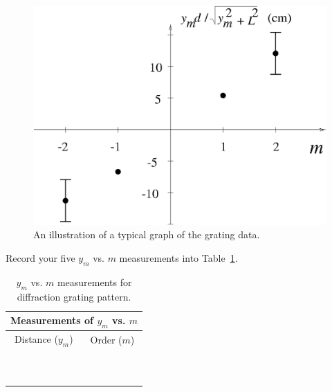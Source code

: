 \begin{figure}[htb]
\centering 
\epsfxsize=7cm \includegraphics[scale=0.6]{10_diffraction/gratgraph.eps}
\caption{An illustration of a typical graph of the grating data.}
\label{fig:diff:gratgraph}
\end{figure}
\vspace*{1cm} 
\noindent 
Record your five $y_m$
vs. $m$ measurements into Table~\ref{tab:DI:Grating}.
\begin{table}[htb]
\begin{center}
\begin{tabular}{|c|c|}
\hline
\multicolumn{2}{|c|}{Measurements of $y_m$ vs. $m$} \\
\hline
Distance ($y_m$) & Order ($m$) \\
\hline
\hspace*{3cm} & \hspace*{3cm}  \\
& \\
\hline
& \\ & \\
\hline
& \\ & \\
\hline
& \\ & \\
\hline
& \\ & \\
\hline
\end{tabular}
\end{center}
\caption{$y_m$ vs. $m$ measurements for diffraction grating pattern.}
\label {tab:DI:Grating}
\end{table}
 
